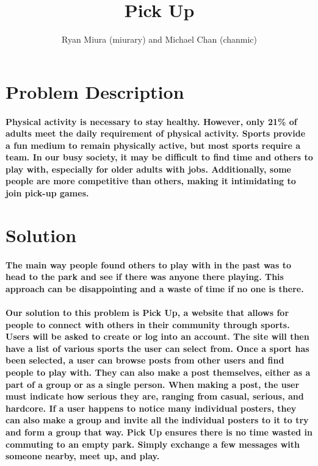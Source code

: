 \documentclass[12pt]{article}
\title{Pick Up}
\author{Ryan Miura (miurary) and Michael Chan (chanmic)}
\begin{document}
	\maketitle
	\tableofcontents
		\section{Problem Description}
        	\paragraph{Physical activity is necessary to stay healthy. However, only 21\% of adults meet the daily requirement of physical activity\cite{cdc}. Sports provide a fun medium to remain physically active, but most sports require a team. In our busy society, it may be difficult to find time and others to play with, especially for older adults with jobs. Additionally, some people are more competitive than others, making it intimidating to join pick-up games.}
        \section{Solution}
        	\paragraph{The main way people found others to play with in the past was to head to the park and see if there was anyone there playing. This approach can be disappointing and a waste of time if no one is there.}
        	\paragraph{Our solution to this problem is Pick Up, a website that allows for people to connect with others in their community through sports. Users will be asked to create or log into an account. The site will then have a list of various sports the user can select from. Once a sport has been selected, a user can browse posts from other users and find people to play with. They can also make a post themselves, either as a part of a group or as a single person. When making a post, the user must indicate how serious they are, ranging from casual, serious, and hardcore. If a user happens to notice many individual posters, they can also make a group and invite all the individual posters to it to try and form a group that way. Pick Up ensures there is no time wasted in commuting to an empty park. Simply exchange a few messages with someone nearby, meet up, and play.}
\end{document}
